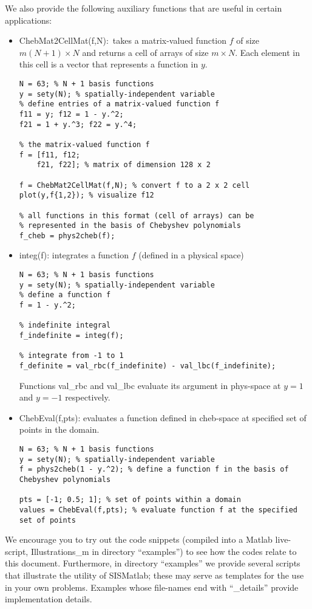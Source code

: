 \documentclass[%
secnumarabic,%
 amssymb, amsmath,%
 aps,prf,superscriptaddress,longbibliography
frontmatterverbose,
]{revtex4-2}
\begin{document}
We also provide the following auxiliary functions that are useful in certain applications:
\begin{itemize}
  
  \item {\sf ChebMat2CellMat(f,N):}~takes a matrix-valued function $f$ of size $m(N+1) \times N$ and returns a cell of arrays of size $m \times N$. Each element in this cell is a vector that represents a function in $y$.
\begin{lstlisting}
N = 63; % N + 1 basis functions
y = sety(N); % spatially-independent variable
% define entries of a matrix-valued function f
f11 = y; f12 = 1 - y.^2;
f21 = 1 + y.^3; f22 = y.^4;

% the matrix-valued function f
f = [f11, f12;
    f21, f22]; % matrix of dimension 128 x 2

f = ChebMat2CellMat(f,N); % convert f to a 2 x 2 cell
plot(y,f{1,2}); % visualize f12

% all functions in this format (cell of arrays) can be
% represented in the basis of Chebyshev polynomials
f_cheb = phys2cheb(f);
\end{lstlisting}    
  
\item {\sf integ(f):} integrates a function $f$ (defined in a physical space)  
\begin{lstlisting}
N = 63; % N + 1 basis functions
y = sety(N); % spatially-independent variable
% define a function f
f = 1 - y.^2;

% indefinite integral
f_indefinite = integ(f);

% integrate from -1 to 1
f_definite = val_rbc(f_indefinite) - val_lbc(f_indefinite);
\end{lstlisting}
Functions {\sf val\_rbc} and {\sf val\_lbc} evaluate its argument in phys-space at $y = 1$ and $y = -1$ respectively.

\item {\sf ChebEval(f,pts):} evaluates a function defined in cheb-space at specified set of points in the domain.
\begin{lstlisting}
N = 63; % N + 1 basis functions
y = sety(N); % spatially-independent variable
f = phys2cheb(1 - y.^2); % define a function f in the basis of Chebyshev polynomials

pts = [-1; 0.5; 1]; % set of points within a domain
values = ChebEval(f,pts); % evaluate function f at the specified set of points
\end{lstlisting}
  
\end{itemize}
We encourage you to try out the code snippets (compiled into a Matlab live-script, {\sf Illustrations\_m} in directory ``examples'') to see how the codes relate to this document. Furthermore, in directory ``examples'' we provide several scripts that illustrate the utility of {\sf SISMatlab}; these may serve as templates for the use in your own problems. Examples whose file-names end with ``\_details'' provide implementation details.
\end{document}
